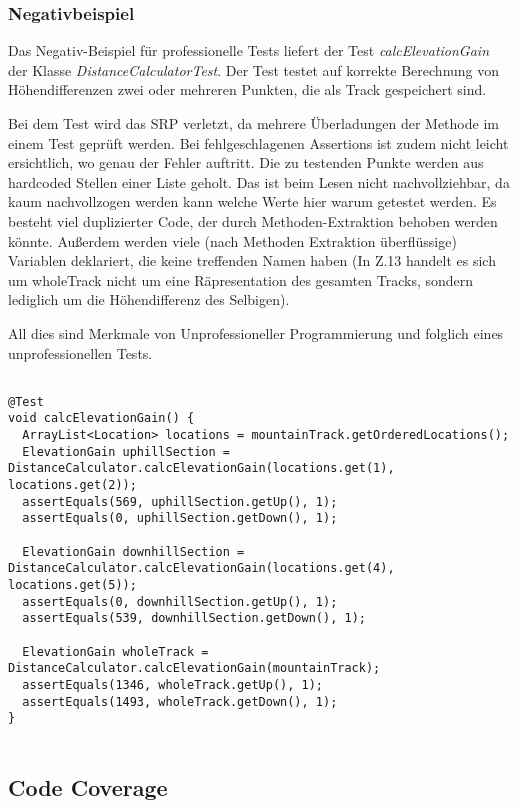 \subsubsection{Negativbeispiel}

Das Negativ-Beispiel für professionelle Tests liefert der Test \textit{calcElevationGain} der Klasse \textit{DistanceCalculatorTest}.
Der Test testet auf korrekte Berechnung von Höhendifferenzen zwei oder mehreren Punkten, die als Track gespeichert sind.

Bei dem Test wird das SRP verletzt, da mehrere Überladungen der Methode im einem Test geprüft werden. Bei fehlgeschlagenen Assertions ist zudem nicht leicht ersichtlich, wo genau der Fehler auftritt.
Die zu testenden Punkte werden aus hardcoded Stellen einer Liste geholt. Das ist beim Lesen nicht nachvollziehbar, da kaum nachvollzogen werden kann welche Werte hier warum getestet werden.
Es besteht viel duplizierter Code, der durch Methoden-Extraktion behoben werden könnte. Außerdem werden viele (nach Methoden Extraktion überflüssige) Variablen deklariert, die keine treffenden Namen haben (In Z.13 handelt es sich um wholeTrack nicht um eine Räpresentation des gesamten Tracks, sondern lediglich um die Höhendifferenz des Selbigen).

All dies sind Merkmale von Unprofessioneller Programmierung und folglich eines unprofessionellen Tests.

\begin{lstlisting}
  
@Test
void calcElevationGain() {
  ArrayList<Location> locations = mountainTrack.getOrderedLocations();
  ElevationGain uphillSection = DistanceCalculator.calcElevationGain(locations.get(1), locations.get(2));
  assertEquals(569, uphillSection.getUp(), 1);
  assertEquals(0, uphillSection.getDown(), 1);

  ElevationGain downhillSection = DistanceCalculator.calcElevationGain(locations.get(4), locations.get(5)); 
  assertEquals(0, downhillSection.getUp(), 1);
  assertEquals(539, downhillSection.getDown(), 1);

  ElevationGain wholeTrack = DistanceCalculator.calcElevationGain(mountainTrack);
  assertEquals(1346, wholeTrack.getUp(), 1);
  assertEquals(1493, wholeTrack.getDown(), 1);
}
    
\end{lstlisting}

\subsection{Code Coverage}

